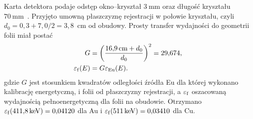 \documentclass[twocolumn,a4paper,10pt]{article}
\begin{document}
Karta detektora podaje odstęp okno--kryształ
$3~\mathrm{mm}$ oraz długość kryształu
$70~\mathrm{mm}$~\cite{detector}. Przyjęto umowną
płaszczyznę rejestracji w połowie kryształu,
czyli $d_0=0{,}3+7{,}0/2=3{,}8$~cm od obudowy.
Prosty transfer wydajności do geometrii folii
miał postać
\begin{equation}
\begin{aligned}
G&=\left(\frac{16{,}9\,\mathrm{cm}+d_0}{d_0}\right)^2
=29{,}674,\\
\varepsilon_{\rm f}(E)&=G\varepsilon_{\rm Eu}(E).
\end{aligned}
\label{eq:geometry}
\end{equation}
gdzie $G$ jest stosunkiem kwadratów odległości źródła Eu dla której wykonano kalibrację energetyczną, i folii od płaszczyzny rejestracji, a $\varepsilon_{\rm f}$
oszacowaną wydajnością pełnoenergetyczną dla folii na obudowie.
Otrzymano $\varepsilon_{\rm f}(411{,}8\,\mathrm{keV})
=0{,}04120$ dla Au i $\varepsilon_{\rm f}
(511\,\mathrm{keV})=0{,}03410$ dla Cu.
\end{document}
